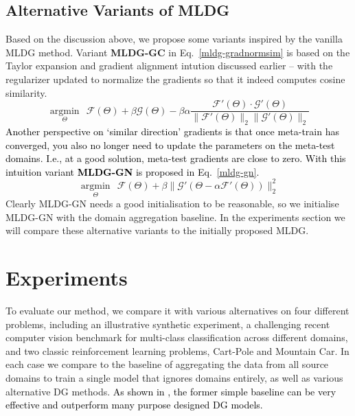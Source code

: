 \documentclass[letterpaper]{article} \usepackage{aaai18}  \usepackage{times}  \usepackage{helvet}  \usepackage{courier}  \usepackage{url}  \usepackage{graphicx}  \usepackage{amsmath}
\begin{document}
{\subsection{Alternative Variants of MLDG}
Based on the discussion above, we propose some variants inspired by the vanilla MLDG method. 
Variant \textbf{MLDG-GC} in Eq.~\ref{mldg-gradnormsim} is based on the Taylor expansion and gradient alignment intution discussed earlier -- with the regularizer updated to normalize the gradients so that it indeed computes cosine similarity. \begin{equation}
\underset{\Theta}{\operatorname{argmin}}~~ \mathcal{F}(\Theta) + \beta \mathcal{G}(\Theta) - \beta\alpha \frac{\mathcal{F}'(\Theta) \cdot \mathcal{G}'(\Theta)}{\|\mathcal{F}'(\Theta)\|_2 \|\mathcal{G}'(\Theta)\|_2}
\label{mldg-gradnormsim}
\end{equation}
\textcolor{black}{Another perspective on `similar direction' gradients is that once meta-train has converged, you also no longer need to update the parameters on the meta-test domains. I.e., at a good solution, meta-test gradients are close to zero. With this intuition variant \textbf{MLDG-GN} is proposed in Eq.~\ref{mldg-gn}.}
\begin{equation}
\underset{\Theta}{\operatorname{argmin}}~~ \mathcal{F}(\Theta) + \beta \|\mathcal{G}'(\Theta - \alpha \mathcal{F}'(\Theta))\|^2_2
\label{mldg-gn}
\end{equation}
Clearly MLDG-GN needs a good initialisation to be reasonable, so we initialise MLDG-GN with the domain aggregation baseline. In the experiments section we will compare these alternative variants to the initially proposed MLDG.

\section{Experiments}
To evaluate our method, we compare it with various alternatives on four different problems, including an illustrative synthetic experiment, a challenging recent computer vision benchmark for multi-class classification across different domains, and two classic reinforcement learning problems, Cart-Pole and Mountain Car. In each case we compare to the baseline of aggregating the data from all source domains to train a single model that ignores domains entirely, as well as various alternative DG methods. \textcolor{black}{As shown in \cite{da2017dg}, the former simple baseline can be very effective and outperform many purpose designed DG models.}

}
\end{document}
